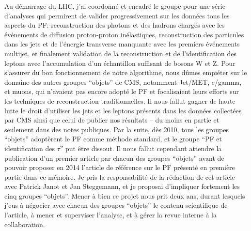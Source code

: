 \documentclass[11pt,twoside,a4paper,tdr]{cms-tdr}
\begin{document}
Au démarrage du LHC, j'ai coordonné et encadré le groupe pour une série d'analyses qui permirent de valider progressivement sur les données tous les aspects du PF: reconstruction des photons et des hadrons chargés avec les événements de diffusion proton-proton inélastiques, reconstruction des particules dans les jets et de l'énergie transverse manquante avec les premiers événements multijet, et finalement validation de la reconstruction et de l'identification des leptons avec l'accumulation d'un échantillon suffisant de bosons W et Z. 
Pour s'assurer du bon fonctionnement de notre algorithme, nous dûmes empiéter sur le domaine des autres groupes ``objets'' de CMS, notamment Jet/MET, e/gamma, et muons, qui n'avaient pas encore adopté le PF et focalisaient leurs efforts sur les techniques de reconstruction traditionnelles. Il nous fallut gagner de haute lutte le droit d'utiliser les jets et les leptons présents dans les données collectées par CMS ainsi que celui de publier nos résultats -- du moins en partie et seulement dans des notes publiques. 
Par la suite, dès 2010, tous les groupes ``objets'' adoptèrent le PF comme méthode standard, et le groupe ``PF et identification des $\tau$'' put être dissout. 
Il nous fallut cependant attendre la publication d'un premier article par chacun des groupes ``objets'' avant de pouvoir proposer en 2014 l'article de référence sur le PF présenté en première partie dans ce mémoire. 
Je pris la responsabilité de la rédaction de cet article avec Patrick Janot et Jan Steggemann, 
et je proposai d'impliquer fortement les cinq groupes ``objets''. 
Mener à bien ce projet nous prit deux ans, durant lesquels j'eus à négocier avec chacun des groupes ``objets'' le contenu scientifique de l'article, à mener et superviser l'analyse, et à gérer la revue interne à la collaboration. 
\end{document}
